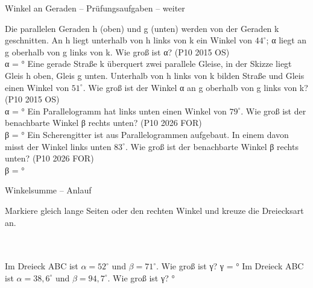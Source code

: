 \begin{aufgabe}{Winkel an Geraden – Prüfungsaufgaben – weiter}
\begin{teile}
\teil Die parallelen Geraden h (oben) und g (unten) werden von der Geraden k geschnitten. An h liegt unterhalb von h links von k ein Winkel von $44^\circ$; α liegt an g oberhalb von g links von k. Wie groß ist α? \hfill (P10 2015 OS) \\

α = \leerfeld °
\teil Eine gerade Straße k überquert zwei parallele Gleise, in der Skizze liegt Gleis h oben, Gleis g unten. Unterhalb von h links von k bilden Straße und Gleis einen Winkel von $51^\circ$. Wie groß ist der Winkel α an g oberhalb von g links von k? \hfill (P10 2015 OS) \\

α = \leerfeld °
\teil Ein Parallelogramm hat links unten einen Winkel von $79^\circ$. Wie groß ist der benachbarte Winkel β rechts unten? \hfill (P10 2026 FOR) \\

β = \leerfeld °
\teil Ein Scherengitter ist aus Parallelogrammen aufgebaut. In einem davon misst der Winkel links unten $83^\circ$. Wie groß ist der benachbarte Winkel β rechts unten? \hfill (P10 2026 FOR) \\

β = \leerfeld °
\end{teile}
\end{aufgabe}

\begin{aufgabe}{Winkelsumme – Anlauf}
\begin{teile}
\teil Markiere gleich lange Seiten oder den rechten Winkel und kreuze die Dreiecksart an. \\  \\  \\ 

\teil Im Dreieck ABC ist $\alpha = 52^\circ$ und $\beta = 71^\circ$. Wie groß ist γ? γ = \leerfeld °
\teil Im Dreieck ABC ist $\alpha = 38{,}6^\circ$ und $\beta = 94{,}7^\circ$. Wie groß ist γ? \leerfeld °
\end{teile}
\end{aufgabe}

